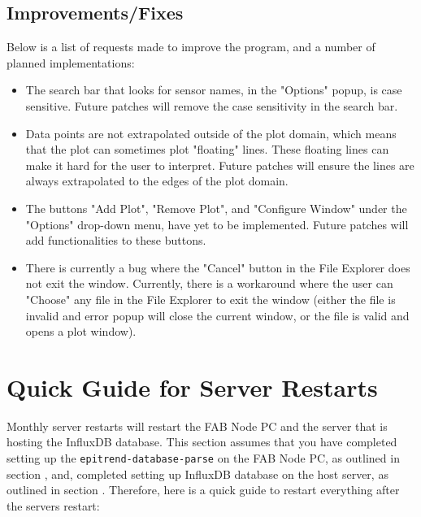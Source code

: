 \documentclass{article}
\begin{document}
\subsection{Improvements/Fixes}
Below is a list of requests made to improve the program, and a number of planned implementations:
\begin{itemize}
    \item The search bar that looks for sensor names, in the "Options" popup, is case sensitive. Future patches will remove the case sensitivity in the search bar.

    \item Data points are not extrapolated outside of the plot domain, which means that the plot can sometimes plot "floating" lines. These floating lines can make it hard for the user to interpret. Future patches will ensure the lines are always extrapolated to the edges of the plot domain.

    \item The buttons "Add Plot", "Remove Plot", and "Configure Window" under the "Options" drop-down menu, have yet to be implemented. Future patches will add functionalities to these buttons.

    \item There is currently a bug where the "Cancel" button in the File Explorer does not exit the window. Currently, there is a workaround where the user can "Choose" any file in the File Explorer to exit the window (either the file is invalid and error popup will close the current window, or the file is valid and opens a plot window).
\end{itemize}

\section{Quick Guide for Server Restarts}
Monthly server restarts will restart the FAB Node PC and the server that is hosting the InfluxDB database. This section assumes that you have completed setting up the \texttt{epitrend-database-parse} on the FAB Node PC, as outlined in section \textbf{}, and, completed setting up InfluxDB database on the host server, as outlined in section \textbf{}. Therefore, here is a quick guide to restart everything after the servers restart:
\end{document}
